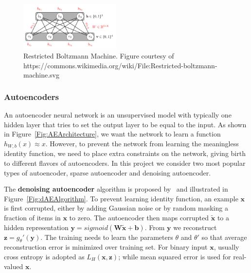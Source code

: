 \begin{figure}[h]
    \centering
    \includegraphics[width=0.45\textwidth]{figures/rbm.png}
    \caption{Restricted Boltzmann Machine.
        Figure courtesy of https://commons.wikimedia.org/wiki/File:Restricted-boltzmann-machine.svg}
    \label{Fig:RBMArchitecture}
\end{figure}



\subsubsection{Autoencoders}
An autoencoder neural network is an unsupervised model with typically one hidden layer that
tries to set the output layer to be equal to the input.
As shown in Figure~\ref{Fig:AEArchitecture}, we want the network to
learn a function $h_{W, b}(x) \approx x$.
However, to prevent the network from learning the meaningless identity function,
we need to place extra constraints on the network, giving birth to different
flavors of autoencoders.
In this project we consider two most popular types of autoencoder, sparse autoencoder and
denoising autoencoder.

The \textbf{denoising autoencoder} algorithm is proposed by~\cite{DenoiseAE} and illustrated in
Figure~\ref{Fig:dAEAlgorithm}.
To prevent learning identity function, an example $\mathbf{x}$ is first corrupted, either by
adding Gaussian noise or by random masking a fraction of items in $\mathbf{x}$ to zero.
The autoencoder then maps corrupted $\mathbf{\tilde{x}}$ to a hidden representation $\mathbf{y} = sigmoid(\mathbf{W}\tilde{\mathbf{x}} + \mathbf{b})$.
From $\mathbf{y}$ we reconstruct $\mathbf{z}=g_\theta'(\mathbf{y})$.
The training needs to learn the parameters $\theta$ and $\theta'$ so that
average reconstruction error is minimized over training set.
For binary input $\mathbf{x}$, usually cross entropy is adopted as $L_H(\mathbf{x}, \mathbf{z})$;
while mean squared error is used for real-valued $\mathbf{x}$.

